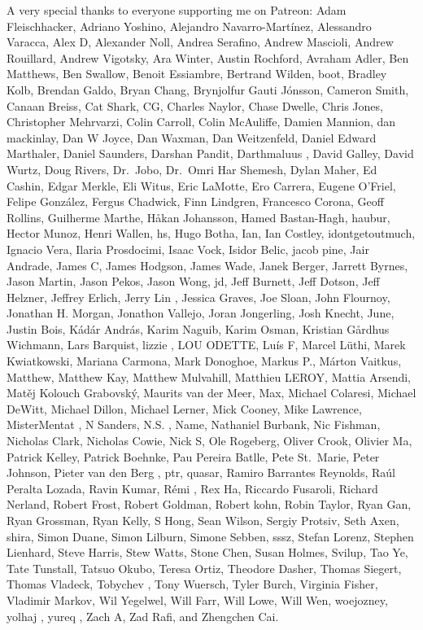 \documentclass[
  letterpaper,
  DIV=11,
  numbers=noendperiod]{scrartcl}
\begin{document}
A very special thanks to everyone supporting me on Patreon: Adam
Fleischhacker, Adriano Yoshino, Alejandro Navarro-Martínez, Alessandro
Varacca, Alex D, Alexander Noll, Andrea Serafino, Andrew Mascioli,
Andrew Rouillard, Andrew Vigotsky, Ara Winter, Austin Rochford, Avraham
Adler, Ben Matthews, Ben Swallow, Benoit Essiambre, Bertrand Wilden,
boot, Bradley Kolb, Brendan Galdo, Bryan Chang, Brynjolfur Gauti
Jónsson, Cameron Smith, Canaan Breiss, Cat Shark, CG, Charles Naylor,
Chase Dwelle, Chris Jones, Christopher Mehrvarzi, Colin Carroll, Colin
McAuliffe, Damien Mannion, dan mackinlay, Dan W Joyce, Dan Waxman, Dan
Weitzenfeld, Daniel Edward Marthaler, Daniel Saunders, Darshan Pandit,
Darthmaluus , David Galley, David Wurtz, Doug Rivers, Dr.~Jobo, Dr.~Omri
Har Shemesh, Dylan Maher, Ed Cashin, Edgar Merkle, Eli Witus, Eric
LaMotte, Ero Carrera, Eugene O'Friel, Felipe González, Fergus Chadwick,
Finn Lindgren, Francesco Corona, Geoff Rollins, Guilherme Marthe, Håkan
Johansson, Hamed Bastan-Hagh, haubur, Hector Munoz, Henri Wallen, hs,
Hugo Botha, Ian, Ian Costley, idontgetoutmuch, Ignacio Vera, Ilaria
Prosdocimi, Isaac Vock, Isidor Belic, jacob pine, Jair Andrade, James C,
James Hodgson, James Wade, Janek Berger, Jarrett Byrnes, Jason Martin,
Jason Pekos, Jason Wong, jd, Jeff Burnett, Jeff Dotson, Jeff Helzner,
Jeffrey Erlich, Jerry Lin , Jessica Graves, Joe Sloan, John Flournoy,
Jonathan H. Morgan, Jonathon Vallejo, Joran Jongerling, Josh Knecht,
June, Justin Bois, Kádár András, Karim Naguib, Karim Osman, Kristian
Gårdhus Wichmann, Lars Barquist, lizzie , LOU ODETTE, Luís F, Marcel
Lüthi, Marek Kwiatkowski, Mariana Carmona, Mark Donoghoe, Markus P.,
Márton Vaitkus, Matthew, Matthew Kay, Matthew Mulvahill, Matthieu LEROY,
Mattia Arsendi, Matěj Kolouch Grabovský, Maurits van der Meer, Max,
Michael Colaresi, Michael DeWitt, Michael Dillon, Michael Lerner, Mick
Cooney, Mike Lawrence, MisterMentat , N Sanders, N.S. , Name, Nathaniel
Burbank, Nic Fishman, Nicholas Clark, Nicholas Cowie, Nick S, Ole
Rogeberg, Oliver Crook, Olivier Ma, Patrick Kelley, Patrick Boehnke, Pau
Pereira Batlle, Pete St.~Marie, Peter Johnson, Pieter van den Berg ,
ptr, quasar, Ramiro Barrantes Reynolds, Raúl Peralta Lozada, Ravin
Kumar, Rémi , Rex Ha, Riccardo Fusaroli, Richard Nerland, Robert Frost,
Robert Goldman, Robert kohn, Robin Taylor, Ryan Gan, Ryan Grossman, Ryan
Kelly, S Hong, Sean Wilson, Sergiy Protsiv, Seth Axen, shira, Simon
Duane, Simon Lilburn, Simone Sebben, sssz, Stefan Lorenz, Stephen
Lienhard, Steve Harris, Stew Watts, Stone Chen, Susan Holmes, Svilup,
Tao Ye, Tate Tunstall, Tatsuo Okubo, Teresa Ortiz, Theodore Dasher,
Thomas Siegert, Thomas Vladeck, Tobychev , Tony Wuersch, Tyler Burch,
Virginia Fisher, Vladimir Markov, Wil Yegelwel, Will Farr, Will Lowe,
Will Wen, woejozney, yolhaj , yureq , Zach A, Zad Rafi, and Zhengchen
Cai.
\end{document}
